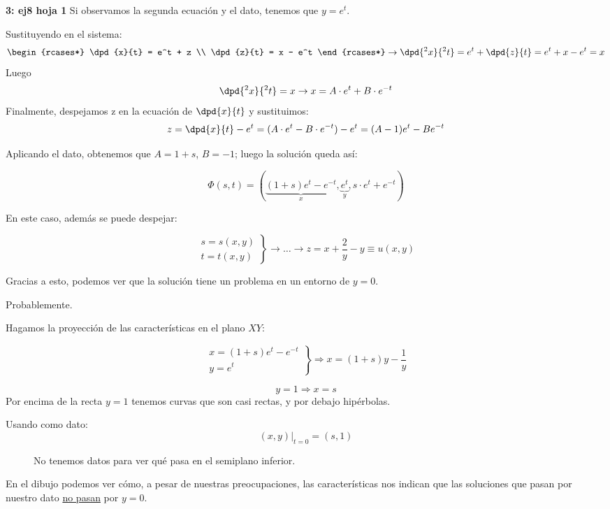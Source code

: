 \begin{example}{\bf3: ej8 hoja 1}
		Si observamos la segunda ecuación y el dato, tenemos que $ y = e^t $.


		Sustituyendo en el sistema:
		\[
		\begin{rcases*}
			 \dpd{x}{t} = e^t + z  \\
			 \dpd{z}{t} = x - e^t
		\end{rcases*}
		\rightarrow \dpd{^2 x}{^2 t} = e^t + \dpd{z}{t} = e^t + x - e^t = x
		\]
		Luego
		$$\dpd{^2 x}{^2 t} = x \rightarrow x = A \cdot e^t + B \cdot e^{-t}$$
		Finalmente, despejamos z en la ecuación de $\dpd{x}{t}$ y sustituimos:
		$$z = \dpd{x}{t} - e^t = (A \cdot e^t - B \cdot e^{-t}) - e^t = (A-1)e^t - B e^{-t}$$

		Aplicando el dato, obtenemos que $A=1+s$, $B=-1$; luego la solución queda así:

		\[ \Phi(s,t) = (\underbrace{(1+s)e^t-e^{-t}}_{x},\underbrace{e^t}_{y}, s\cdot e^t + e^{-t}) \]

		En este caso, además se puede despejar:

		\[  \left. \begin{array}{r}
		s = s(x,y) \\
		t = t(x,y)
		\end{array}
		\right\}\rightarrow \dots \rightarrow z = x + \frac{2}{y} - y \equiv u(x,y)
		\]

		Gracias a esto, podemos ver que la solución tiene un problema en un entorno de ${y = 0}$.

		 Probablemente.

		Hagamos la proyección de las características en el plano $XY$:

		\[
		\left.
		\begin{array}{l}
			x = (1+s)e^t - e^{-t} \\
			y = e^{t}
		\end{array}
		\right\}
		\Rightarrow x = (1+s) y - \frac{1}{y}
		\]

		\[ y = 1 \Rightarrow x = s \] Por encima de la recta $y=1$ tenemos curvas que son casi rectas, y por debajo hipérbolas.

		Usando como dato: \[ (x,y) |_{t=0} = (s,1) \]

		\begin{figure}[hbtp]
			\caption{No tenemos datos para ver qué pasa en el semiplano inferior.}
			\label{fig:Ejemplo-3-feb-09-proy-XY}
		\end{figure}

		En el dibujo podemos ver cómo, a pesar de nuestras preocupaciones, las características nos indican que las soluciones que pasan por nuestro dato \underline{no pasan} por $y=0$.

	\end{example}


